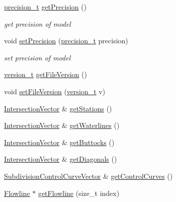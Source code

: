 \begin{DoxyCompactItemize}
\hyperlink{namespaceShipCAD_ae13c7e36dfb1e2300741a631041cd915}{precision\-\_\-t} \hyperlink{classShipCAD_1_1ShipCADModel_a949318726227fe0ba274b34d2ea4528a}{get\-Precision} ()
\begin{DoxyCompactList}\small\item\em get precision of model \end{DoxyCompactList}\item 
void \hyperlink{classShipCAD_1_1ShipCADModel_a6133fe12cd13b6ce24424e19a8b1e433}{set\-Precision} (\hyperlink{namespaceShipCAD_ae13c7e36dfb1e2300741a631041cd915}{precision\-\_\-t} precision)
\begin{DoxyCompactList}\small\item\em set precision of model \end{DoxyCompactList}\item 
\hyperlink{namespaceShipCAD_af3a6fa23a7318acbda7b0066b53d694f}{version\-\_\-t} \hyperlink{classShipCAD_1_1ShipCADModel_a17ecfdd29efc03ed2580b89f5da955c8}{get\-File\-Version} ()
\item 
void \hyperlink{classShipCAD_1_1ShipCADModel_a44ac7a48c0c01cae73bf723120071e72}{set\-File\-Version} (\hyperlink{namespaceShipCAD_af3a6fa23a7318acbda7b0066b53d694f}{version\-\_\-t} v)
\item 
\hyperlink{namespaceShipCAD_a9910f0963197f9df6125398efd4fa139}{Intersection\-Vector} \& \hyperlink{classShipCAD_1_1ShipCADModel_a86da3ca66e90403ead21ccc67f584c52}{get\-Stations} ()
\item 
\hyperlink{namespaceShipCAD_a9910f0963197f9df6125398efd4fa139}{Intersection\-Vector} \& \hyperlink{classShipCAD_1_1ShipCADModel_a6c147a75fa02e43145de346efb9542fd}{get\-Waterlines} ()
\item 
\hyperlink{namespaceShipCAD_a9910f0963197f9df6125398efd4fa139}{Intersection\-Vector} \& \hyperlink{classShipCAD_1_1ShipCADModel_a8908d7adff0b1aa1ed118103c02c5402}{get\-Buttocks} ()
\item 
\hyperlink{namespaceShipCAD_a9910f0963197f9df6125398efd4fa139}{Intersection\-Vector} \& \hyperlink{classShipCAD_1_1ShipCADModel_a19864f7628c596553f7c89247715b10a}{get\-Diagonals} ()
\item 
\hyperlink{namespaceShipCAD_aa9dd7a826ae5254e377dac43ea19da80}{Subdivision\-Control\-Curve\-Vector} \& \hyperlink{classShipCAD_1_1ShipCADModel_ac631aaf60a936bb5b22bcab59cb7d6a4}{get\-Control\-Curves} ()
\item 
\hyperlink{classShipCAD_1_1Flowline}{Flowline} $\ast$ \hyperlink{classShipCAD_1_1ShipCADModel_afc5654f671a17dd6672230648842975e}{get\-Flowline} (size\-\_\-t index)

\end{DoxyCompactItemize}

